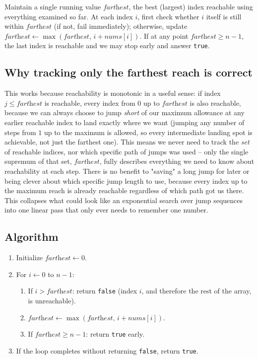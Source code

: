 \begin{ideabox}
Maintain a single running value $\textit{farthest}$, the best (largest)
index reachable using everything examined so far. At each index $i$, first
check whether $i$ itself is still within $\textit{farthest}$ (if not, fail
immediately); otherwise, update
$\textit{farthest} \gets \max(\textit{farthest},\, i + \textit{nums}[i])$.
If at any point $\textit{farthest} \ge n-1$, the last index is reachable and
we may stop early and answer \texttt{true}.
\end{ideabox}

\subsection*{Why tracking only the farthest reach is correct}

This works because reachability is monotonic in a useful sense: if index
$j \le \textit{farthest}$ is reachable, every index from $0$ up to
$\textit{farthest}$ is also reachable, because we can always choose to jump
\emph{short} of our maximum allowance at any earlier reachable index to land
exactly where we want (jumping any number of steps from $1$ up to the
maximum is allowed, so every intermediate landing spot is achievable, not
just the farthest one). This means we never need to track the \emph{set} of
reachable indices, nor which specific path of jumps was used -- only the
single supremum of that set, $\textit{farthest}$, fully describes everything
we need to know about reachability at each step. There is no benefit to
"saving" a long jump for later or being clever about which specific jump
length to use, because every index up to the maximum reach is already
reachable regardless of which path got us there. This collapses what could
look like an exponential search over jump sequences into one linear pass
that only ever needs to remember one number.

\subsection*{Algorithm}

\begin{enumerate}
  \item Initialize $\textit{farthest} \gets 0$.
  \item For $i \gets 0$ to $n-1$:
  \begin{enumerate}
    \item If $i > \textit{farthest}$: return \texttt{false} (index $i$, and
          therefore the rest of the array, is unreachable).
    \item $\textit{farthest} \gets \max(\textit{farthest},\, i +
          \textit{nums}[i])$.
    \item If $\textit{farthest} \ge n-1$: return \texttt{true} early.
  \end{enumerate}
  \item If the loop completes without returning \texttt{false}, return
        \texttt{true}.
\end{enumerate}

